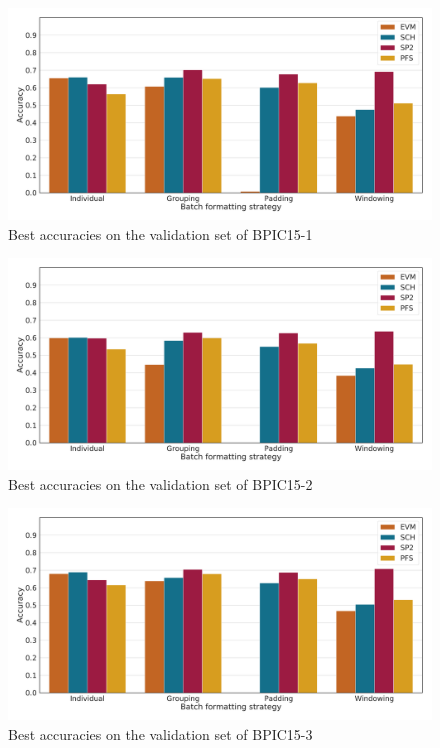 \begin{figure}
    \centering
    \includegraphics[width=\textwidth]{gfx/bpic2015_1/accuracies.pdf}
    \caption{Best accuracies on the validation set of BPIC15-1}
    \label{fig:max-accuracies-bpic2015-1}
\end{figure}
\begin{figure}
    \centering
    \includegraphics[width=\textwidth]{gfx/bpic2015_2/accuracies.pdf}
    \caption{Best accuracies on the validation set of BPIC15-2}
    \label{fig:max-accuracies-bpic2015-2}
\end{figure}
\begin{figure}
    \centering
    \includegraphics[width=\textwidth]{gfx/bpic2015_3/accuracies.pdf}
    \caption{Best accuracies on the validation set of BPIC15-3}
    \label{fig:max-accuracies-bpic2015-3}
\end{figure}
